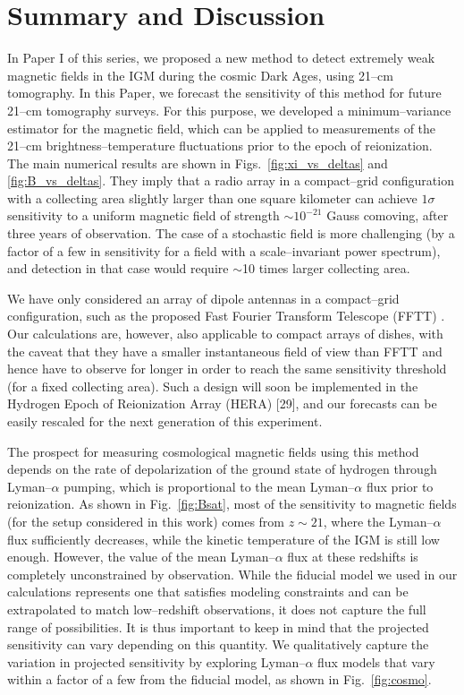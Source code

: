 \section{Summary and Discussion}
\label{sec:conclusions}

In Paper I of this series, we proposed a new method to detect extremely weak magnetic fields in the IGM during the cosmic Dark Ages, using 21--cm tomography. In this Paper, we forecast the sensitivity of this method for future 21--cm tomography surveys. For this purpose, we developed a minimum--variance estimator for the magnetic field, which can be applied to measurements of the 21--cm brightness--temperature fluctuations prior to the epoch of reionization. The main numerical results are shown in Figs.~\ref{fig:xi_vs_deltas} and \ref{fig:B_vs_deltas}. They imply that a radio array in a compact--grid configuration with a collecting area slightly larger than one square kilometer can achieve $1\sigma$ sensitivity to a uniform magnetic field of strength $\sim$$10^{-21}$ Gauss comoving, after three years of observation. The case of a stochastic field is more challenging (by a factor of a few in sensitivity for a field with a scale--invariant power spectrum), and detection in that case would require $\sim$10 times larger collecting area.

We have only considered an array of dipole antennas in a compact--grid configuration, such as the proposed Fast Fourier Transform Telescope (FFTT) \cite{2009PhRvD..79h3530T}. Our calculations are, however, also applicable to compact arrays of dishes, with the caveat that they have a smaller instantaneous field of view than FFTT and hence have to observe for longer in order to reach the same sensitivity threshold (for a fixed collecting area). Such a design will soon be implemented in the Hydrogen Epoch of Reionization Array (HERA) [29], and our forecasts can be easily rescaled for the next generation of this experiment.

The prospect for measuring cosmological magnetic fields using this method depends on the rate of depolarization of the ground state of hydrogen through Lyman--$\alpha$ pumping, which is proportional to the mean Lyman--$\alpha$ flux prior to reionization. As shown in Fig.~\ref{fig:Bsat}, most of the sensitivity to magnetic fields (for the setup considered in this work) comes from $z\sim 21$, where the Lyman--$\alpha$ flux sufficiently decreases, while the kinetic temperature of the IGM is still low enough. However, the value of the mean Lyman--$\alpha$ flux at these redshifts is completely unconstrained by observation. While the fiducial model we used in our calculations represents one that satisfies modeling constraints and can be extrapolated to match low--redshift observations, it does not capture the full range of possibilities. It is thus important to keep in mind that the projected sensitivity can vary depending on this quantity. We qualitatively capture the variation in projected sensitivity by exploring Lyman--$\alpha$ flux models that vary within a factor of a few from the fiducial model, as shown in Fig.~\ref{fig:cosmo}.

